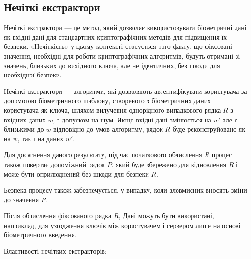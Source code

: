 \documentclass[11pt]{article}
\begin{document}
    \hypertarget{ux43dux435ux447ux456ux442ux43aux456-ux435ux43aux441ux442ux440ux430ux43aux442ux43eux440ux438}{%
\subsection{Нечіткі
екстрактори}\label{ux43dux435ux447ux456ux442ux43aux456-ux435ux43aux441ux442ux440ux430ux43aux442ux43eux440ux438}}
\vspace{5ex}
    Нечіткі екстрактори --- це метод, який дозволяє використовувати
біометричні дані як вхідні дані для стандартних криптографічних методів
для підвищення їх безпеки. «Нечіткість» у цьому контексті стосується
того факту, що фіксовані значення, необхідні для роботи криптографічних алгоритмів, будуть
отримані зі значень, близьких до вихідного ключа, але не ідентичних, без
шкоди для необхідної безпеки.

Нечіткі екстрактори --- алгоритми, які дозволяють
автентифікувати користувача за допомогою біометричного шаблону,
створеного з біометричних даних користувача як ключа, шляхом вилучення
однорідного випадкового рядка \(R\) з вхідних даних \(w\), з допуском на
шум. Якщо вхідні дані змінюється на \(w'\) але є близькими до \(w\)
відповідно до умов алгоритму, рядок \(R\) буде реконструйовано як на
\(w\), так і на даних \(w'\).

Для досягнення даного результату, під час початкового обчислення \(R\)
процес також повертає допоміжний рядок \(P\), який буде збережено для
відновлення \(R\) і може бути оприлюднений без шкоди для безпеки \(R\).

Безпека процесу також забезпечується, у випадку, коли зловмисник вносить
зміни до значення \(P\).

Після обчислення фіксованого рядка \(R\), Дані можуть бути використані,
наприклад, для узгодження ключів між користувачем і сервером лише на
основі біометричного введення.

\vspace{5ex}
Властивості нечітких екстракторів:
\end{document}
